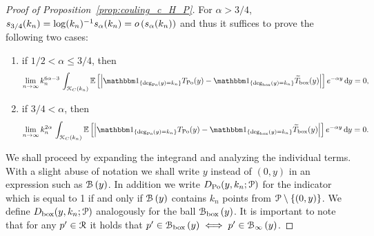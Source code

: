 \begin{proof}[Proof of Proposition~\ref{prop:couling_c_H_P}]
For $\alpha > 3/4$, $s_{3/4}(k_n) = \log(k_n)^{-1} s_\alpha(k_n) = o\left(s_\alpha(k_n)\right)$ and thus it suffices to prove the following two cases:
\begin{enumerate}
\item if $1/2 < \alpha \leq 3/4$, then
\[
	\lim_{n\to \infty} k_n^{6\alpha - 3} \, \int_{\Kcal_{C}(k_n)} 
		\Exp{\left|\ind{\mathrm{deg}_{\Po}(y) = k_n} T_{\Po}(y)
		- \ind{\mathrm{deg}_{\mathrm{box}}(y) = k_n} \widetilde{T}_{\mathrm{box}}(y)\right|} e^{-\alpha y} \dd y = 0,
\]
\item if $3/4 < \alpha$, then
\[ 
	\lim_{n\to \infty} k_n^{2\alpha} \, \int_{\Kcal_{C}(k_n)} 
		\Exp{\left|\ind{\mathrm{deg}_{\Po}(y) = k_n} T_{\Po}(y)
		- \ind{\mathrm{deg}_{\mathrm{box}}(y) = k_n} \widetilde{T}_{\mathrm{box}}(y)\right|} e^{-\alpha y} \dd y = 0.
\]
\end{enumerate}
We shall proceed by expanding the integrand and analyzing the individual terms. With a slight abuse of notation we shall write $y$ instead of $(0,y)$ in an expression such as ${\mathcal B}\left(y\right)$. In addition we write $D_{{\mathrm{Po}}}(y,k_n;{\mathcal P})$ for the indicator which is equal to 1 if and only if ${\mathcal B}\left(y\right)$ contains $k_n$ points from ${\mathcal P} \setminus \{(0,y)\}$. We define $D_{\text{box}}(y,k_n;{\mathcal P})$ analogously for the ball ${\mathcal B}_{\text{box}}\left(y\right)$. It is important to note that for any $p^\prime \in {\mathcal R}$ it holds that $p^\prime \in {\mathcal B}_{\text{box}}\left(y\right) \iff p^\prime \in {\mathcal B}_{\infty}\left(y\right)$.





\end{proof}
